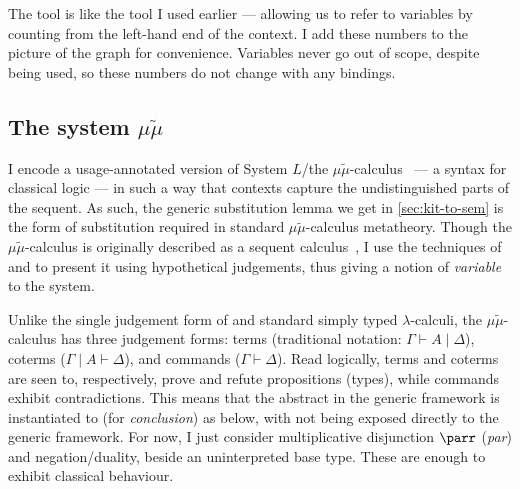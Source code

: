 The  tool is like the  tool I used
earlier --- allowing us to refer to variables by counting from the left-hand end
of the context.
I add these numbers to the picture of the graph for convenience.
Variables never go out of scope, despite being used, so these numbers do not
change with any bindings.

\noindent
\begin{minipage}[t]{0.33\textwidth}
\end{minipage}
\begin{minipage}[t]{0.67\textwidth}
  \AgdaNoSpaceAroundCode{}
  \AgdaSpaceAroundCode{}
\end{minipage}

\subsection{The system $\mu\tilde\mu$}\label{sec:mu-mu-tilde}
I encode a usage-annotated version of System $L$/the
$\mu\tilde\mu$-calculus~\citep{CH00} --- a syntax for classical logic --- in
such a way that contexts capture the undistinguished parts of the sequent.
As such, the generic substitution lemma we get in \cref{sec:kit-to-sem} is the
form of substitution required in standard $\mu\tilde\mu$-calculus metatheory.
Though the $\mu\tilde\mu$-calculus is originally described as a sequent
calculus~\citep{CH00}, I use the techniques of
\citet[p.~12]{herbelin-hab} and \citet{LC06} to present it using hypothetical
judgements, thus giving a notion of \emph{variable} to the system.

Unlike the single judgement form of \name{} and standard simply typed
$\lambda$-calculi, the $\mu\tilde\mu$-calculus has three judgement forms:
terms (traditional notation: $\Gamma \vdash A \mid \Delta$), coterms
($\Gamma \mid A \vdash \Delta$), and commands ($\Gamma \vdash \Delta$).
Read logically, terms and coterms are seen to, respectively, prove and refute
propositions (types), while commands exhibit contradictions.
This means that the abstract  in the generic framework is
instantiated to  (for \emph{conclusion}) as below, with
 not being exposed directly to the generic framework.
For now, I just consider multiplicative disjunction $\parr$ (\emph{par}) and
negation/duality, beside an uninterpreted base type.
These are enough to exhibit classical behaviour.

